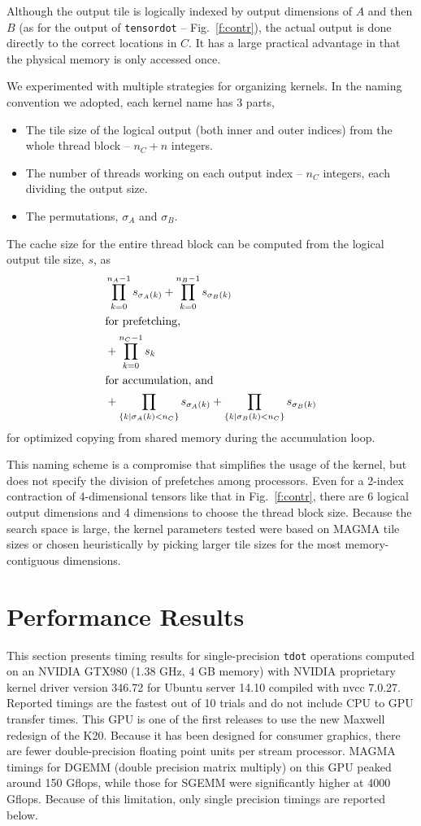 \documentclass{sigplanconf}
\begin{document}
  Although the output tile is logically indexed by output dimensions of
$A$ and then $B$ (as for the output of {\tt tensordot} -- Fig.~\ref{f:contr}),
the actual output is done directly to the correct locations in $C$.
It has a large practical advantage in that the physical
memory is only accessed once.

  We experimented with multiple strategies for organizing kernels.
In the naming convention we adopted, each kernel name has 3 parts,
\begin{itemize}
\item The tile size of the logical output (both inner and outer indices) from the whole thread block -- $n_C + n$ integers.
\item The number of threads working on each output index -- $n_C$ integers, each dividing the output size.
\item The permutations, $\sigma_A$ and $\sigma_B$.
\end{itemize}
The cache size for the entire thread block can be computed from the
logical output tile size, $s$, as
\begin{align}
&\prod_{k=0}^{n_A-1} s_{\sigma_A(k)} + \prod_{k=0}^{n_B-1} s_{\sigma_B(k)} \\
\intertext{for prefetching,}
&+ \prod_{k=0}^{n_C-1} s_k \\
\intertext{for accumulation, and}
&+ \prod_{\{k | \sigma_A(k) < n_C\}} s_{\sigma_A(k)}
 + \prod_{\{k | \sigma_B(k) < n_C\}} s_{\sigma_B(k)}
\end{align}
for optimized copying from shared memory during the accumulation loop.


  This naming scheme is a compromise that simplifies the usage of the kernel,
but does not specify the division of prefetches among processors.
Even for a 2-index contraction of 4-dimensional tensors like that in Fig.~\ref{f:contr},
there are 6 logical output dimensions and 4 dimensions to choose
the thread block size.  Because the search space is large, the kernel parameters
tested were based on MAGMA tile sizes or chosen heuristically by picking
larger tile sizes for the most memory-contiguous dimensions.

\section{ Performance Results}\label{s:perf}

  This section presents timing results for single-precision {\tt tdot} operations computed
on an NVIDIA GTX980 (1.38 GHz, 4 GB memory) with NVIDIA proprietary
kernel driver version 346.72 for Ubuntu server 14.10 compiled with nvcc 7.0.27.
Reported timings are the fastest out of 10 trials and do not include CPU to GPU transfer times.
This GPU is one of the first releases to use the new Maxwell redesign of
the K20.  Because it has been designed for consumer graphics,
there are fewer double-precision floating point units per stream processor.
MAGMA timings for DGEMM (double precision matrix multiply)
on this GPU peaked around 150 Gflops, while those
for SGEMM were significantly higher at 4000 Gflops.  Because of this limitation,
only single precision timings are reported below.
\end{document}
